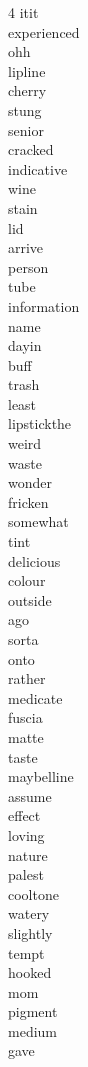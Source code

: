 \begin{multicols}{4}
	itit\\ experienced\\ ohh\\ lipline\\ cherry\\ stung\\ senior\\ cracked\\
	indicative\\

	wine\\ stain\\ lid\\ arrive\\ person\\ tube\\ information\\ name\\ dayin\\ buff\\
	trash\\ least\\ lipstickthe\\ weird\\ waste\\ wonder\\ fricken\\ somewhat\\
	tint\\ delicious\\ colour\\ outside\\ ago\\ sorta\\ onto\\ rather\\ medicate\\
	fuscia\\ matte\\ taste\\ maybelline\\ assume\\ effect\\ loving\\ nature\\ palest\\
	cooltone\\ watery\\ slightly\\ tempt\\ hooked\\ mom\\ pigment\\ medium\\ gave\\

\end{multicols}
